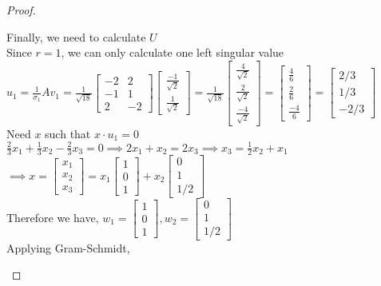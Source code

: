 \documentclass[12pt]{article}
\begin{document}
\begin{proof}
\begin{enumerate}[label=(\alph*)]
Finally, we need to calculate $U$ \\
Since $r=1$, we can only calculate one left singular value \\ 
$u_1 = \frac{1}{\sigma_1} Av_1 = \frac{1}{\sqrt{18}} \begin{bmatrix}
    -2 & 2 \\
    -1 & 1 \\ 
    2 & -2 
\end{bmatrix} \begin{bmatrix}
\frac{-1}{\sqrt{2}} \\ \frac{1}{\sqrt{2}}
\end{bmatrix} = \frac{1}{\sqrt{18}}\begin{bmatrix}
    \frac{4}{\sqrt{2}} \\
    \frac{2}{\sqrt{2}} \\ 
    \frac{-4}{\sqrt{2}}
\end{bmatrix} = \begin{bmatrix}
    \frac{4}{6} \\
    \frac{2}{6} \\ 
    \frac{-4}{6}
\end{bmatrix} = \begin{bmatrix}
    2/3 \\ 1/3 \\ -2/3
\end{bmatrix}$   \\

Need $x$ such that $x \cdot u_1 = 0$ \\
$\frac{2}{3} x_1 + \frac{1}{3}x_2 - \frac{2}{3}x_3 = 0 \implies 2x_1 + x_2 = 2x_3 \implies x_3 = \frac{1}{2}x_2 + x_1 $ \\
$\implies x = \begin{bmatrix}
    x_1 \\ x_2 \\ x_3 
\end{bmatrix} =  x_1\begin{bmatrix}
   1 \\ 0 \\ 1
\end{bmatrix} + x_2\begin{bmatrix}
   0 \\ 1 \\ 1/2
\end{bmatrix}$ \\
Therefore we have,
$w_1 =  \begin{bmatrix}
   1 \\ 0 \\ 1
\end{bmatrix}, w_2= \begin{bmatrix}
   0 \\ 1 \\ 1/2
\end{bmatrix}$ \\
Applying Gram-Schmidt, \\


\end{enumerate}
\end{proof}
\end{document}
